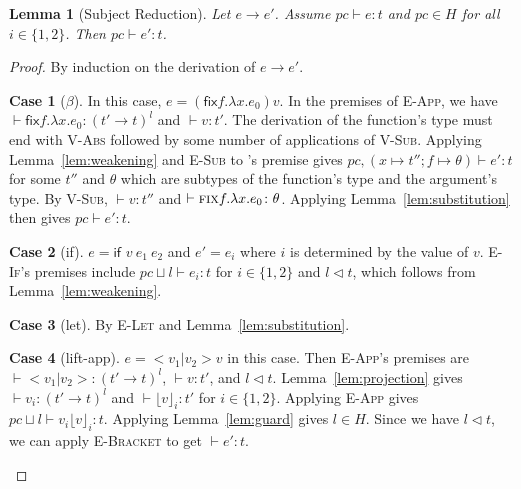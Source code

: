 \documentclass[a4paper,twocolumn]{article}
\newcommand{\typeRule}[3]{#1 \vdash #2 \colon #3}
\newcommand{\guards}[0]{\lhd}
\newcommand{\lift}[1]{\lfloor #1 \rfloor}
\theoremstyle{plain}
\newtheorem{lemma}{Lemma}
\theoremstyle{definition}
\newtheorem*{case}{Case}
\begin{document}
\begin{lemma}[Subject Reduction]
  \label{lem:subj_red}
  Let $e \to e'$.  Assume $\typeRule{pc}{e}{t}$ and $pc \in H$ for all $i \in
  \{1, 2\}$.  Then $\typeRule{pc}{e'}{t}$.
\end{lemma}
\begin{proof}
  By induction on the derivation of $e \to e'$.
  \begin{case}[$\beta$]
    In this case, $e = (\textsf{fix} f . \lambda x . e_0) v$.  In the premises
    of \textsc{E-App}, we have $\typeRule{ }{\textsf{fix} f . \lambda x .
    e_0}{(t' \to t)^l}$ and $\typeRule{ }{v}{t'}$.  The derivation of the
    function's type must end with \textsc{V-Abs} followed by some number of
    applications of \textsc{V-Sub}.  Applying Lemma~\ref{lem:weakening} and
    \textsc{E-Sub} to 's premise gives $\typeRule{pc, (x \mapsto
    t''; f \mapsto \theta)}{e'}{t}$ for some $t''$ and $\theta$ which are
    subtypes of the function's type and the argument's type.  By \textsc{V-Sub},
    $\typeRule{ }{v}{t''}$ and $\typeRule{ }{\textsc{fix} f . \lambda x .
    e_0}{\theta}$.  Applying Lemma~\ref{lem:substitution} then gives
    $\typeRule{pc}{e'}{t}$.
  \end{case}

  \begin{case}[if]
    $e = \textsf{if } v \: e_1 \: e_2$ and $e' = e_i$ where $i$ is determined by
    the value of $v$.  \textsc{E-If}'s premises include $\typeRule{pc
    \sqcup l}{e_i}{t}$ for $i \in \{1, 2\}$ and $l \guards t$, which follows
    from Lemma~\ref{lem:weakening}.
  \end{case}

  \begin{case}[let]
    By \textsc{E-Let} and Lemma~\ref{lem:substitution}.
  \end{case}

  \begin{case}[lift-app]
    $e = <v_1 | v_2> v$ in this case.  Then \textsc{E-App}'s premises are
    $\typeRule{ }{<v_1 | v_2>}{(t' \to t)^l}$, $\typeRule{ }{v}{t'}$, and $l
    \guards t$.  Lemma~\ref{lem:projection} gives $\typeRule{ }{v_i}{(t' \to
    t)^l}$ and $\typeRule{ }{\lift{v}_i}{t'}$ for $i \in \{1, 2\}$.  Applying
    \textsc{E-App} gives $\typeRule{pc \sqcup l}{v_i\lift{v}_i}{t}$.  Applying
    Lemma~\ref{lem:guard} gives $l \in H$.  Since we have $l \guards t$, we can
    apply \textsc{E-Bracket} to get $\typeRule{ }{e'}{t}$.
  \end{case}


\end{proof}
\end{document}
